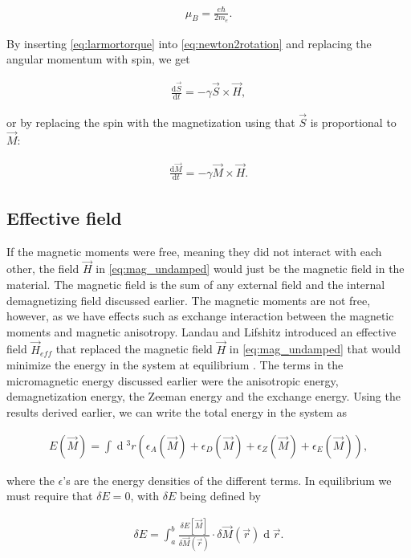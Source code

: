 \documentclass[1p]{elsarticle}		%
\renewcommand{\d}[1]{\ensuremath{\operatorname{d}\!{#1}}}
\begin{document}
\begin{align}
\mu_B = \frac{e\hbar}{2m_e}.
\end{align}

By inserting \eqref{eq:larmortorque} into \eqref{eq:newton2rotation} and replacing the angular momentum with spin, we get

\begin{align}
\frac{\textrm{d} \vec{S}}{\textrm{d} t} =- \gamma \vec{S} \times \vec{H},
\end{align}

or by replacing the spin with the magnetization using that $\vec{S}$ is proportional to $\vec{M}$:

\begin{align}
\label{eq:mag_undamped}
\frac{\textrm{d} \vec{M}}{\textrm{d} t} = -\gamma \vec{M} \times \vec{H}.
\end{align}

\subsection{Effective field}

If the magnetic moments were free, meaning they did not interact with each other, the field $\vec{H}$ in \eqref{eq:mag_undamped} would just be the magnetic field in the material. The magnetic field is the sum of any external field and the internal demagnetizing field discussed earlier. The magnetic moments are not free, however, as we have effects such as exchange interaction between the magnetic moments and magnetic anisotropy. Landau and Lifshitz introduced an effective field $\vec{H}_{eff}$ that replaced the magnetic field $\vec{H}$ in \eqref{eq:mag_undamped} that would minimize the energy in the system at equilibrium \cite{LandauLifshitz1935}. The terms in the micromagnetic energy discussed earlier were the anisotropic energy, demagnetization energy, the Zeeman energy and the exchange energy. Using the results derived earlier, we can write the total energy in the system as

\begin{align}
\label{eq:micromagneticenergy}
E(\vec{M}) = \int \d {^3} r (\epsilon_A(\vec{M}) + \epsilon_D(\vec{M}) + \epsilon_Z(\vec{M}) + \epsilon_E(\vec{M})),
\end{align}

where the $\epsilon$'s are the energy densities of the different terms. In equilibrium we must require that $\delta E=0$, with $\delta E$ being defined by

\begin{align}
\label{eq:deltaE}
\delta E = \int_a^b \frac{\delta E[\vec{M}]}{\delta \vec{M}(\vec{r})}\cdot \delta \vec{M}(\vec{r}) \d {\vec{r}}.
\end{align}
\end{document}
